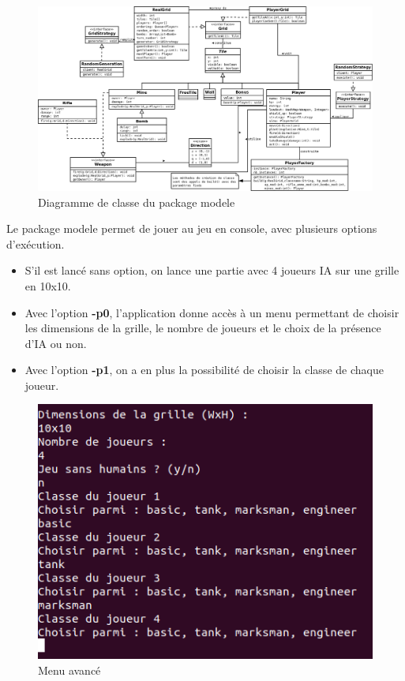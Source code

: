 \documentclass[a4paper,12pt]{article} %
\begin{document}
\begin{figure}[!h]
\centering
\includegraphics[scale=0.33]{images/modele.png}
\caption{Diagramme de classe du package modele}
\end{figure}

Le package modele permet de jouer au jeu en console, avec plusieurs options d'exécution.
\begin{itemize}
\item S'il est lancé sans option, on lance une partie avec 4 joueurs IA sur une grille en 10x10.
\item Avec l'option \textbf{-p0}, l'application donne accès à un menu permettant de choisir les dimensions de la grille, le nombre de joueurs et le choix de la présence d'IA ou non.
\item Avec l'option \textbf{-p1}, on a en plus la possibilité de choisir la classe de chaque joueur.
\end{itemize}

\begin{figure}[!h]
\centering
\includegraphics[scale=0.5]{images/menu.png}
\caption{Menu avancé}
\end{figure}
\end{document}
